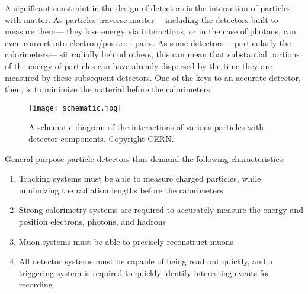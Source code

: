 A significant constraint in the design of detectors is the interaction of particles with matter. As particles traverse matter--- including the detectors built to measure them--- they lose energy via interactions, or in the case of photons, can even convert into electron/positron pairs. As some detectors--- particularly the calorimeters--- sit radially behind others, this can mean that substantial portions of the energy of particles can have already dispersed by the time they are measured by these subsequent detectors. One of the keys to an accurate detector, then, is to minimize the material before the calorimeters. %



\begin{figure}
\centering
\texttt{[image: schematic.jpg]}
\caption{A schematic diagram of the interactions of various particles with detector components. Copyright CERN.}
\label{fig:detector:schematic}
\end{figure}


General purpose particle detectors thus demand the following characteristics: 

\begin{enumerate}
	\item Tracking systems must be able to measure charged particles, while minimizing the radiation lengths before the calorimeters
	\item Strong calorimetry systems are required to accurately measure the energy and position electrons, photons, and hadrons
	\item Muon systems must be able to precisely reconstruct muons
	\item All detector systems must be capable of being read out quickly, and a triggering system is required to quickly identify interesting events for recording
\end{enumerate}

